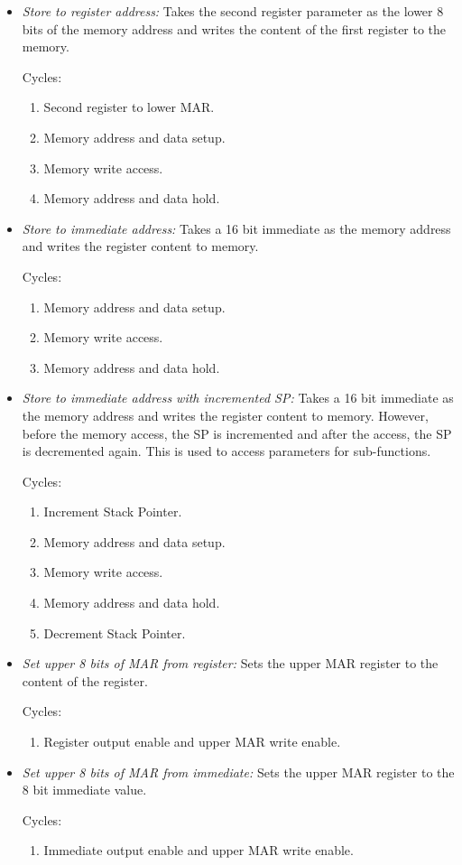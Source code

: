 \begin{itemize}
  \item \emph{Store to register address:} Takes the second register parameter as the lower 8 bits of the memory address and writes the content of the first register to the memory.

  Cycles:
  \begin{enumerate}
    \item Second register to lower \gls{MAR}.
    \item Memory address and data setup.
    \item Memory write access.
    \item Memory address and data hold.
  \end{enumerate}

  \item \emph{Store to immediate address:} Takes a 16 bit immediate as the memory address and writes the register content to memory.

  Cycles:
  \begin{enumerate}
    \item Memory address and data setup.
    \item Memory write access.
    \item Memory address and data hold.
  \end{enumerate}

  \item \emph{Store to immediate address with incremented \gls{SP}:} Takes a 16 bit immediate as the memory address and writes the register content to memory.
  However, before the memory access, the \gls{SP} is incremented and after the access, the \gls{SP} is decremented again.
  This is used to access parameters for sub-functions.

  Cycles:
  \begin{enumerate}
    \item Increment Stack Pointer.
    \item Memory address and data setup.
    \item Memory write access.
    \item Memory address and data hold.
    \item Decrement Stack Pointer.
  \end{enumerate}

  \item \emph{Set upper 8 bits of \gls{MAR} from register:} Sets the upper \gls{MAR} register to the content of the register.

  Cycles:
  \begin{enumerate}
    \item Register output enable and upper \gls{MAR} write enable.
  \end{enumerate}

  \item \emph{Set upper 8 bits of \gls{MAR} from immediate:} Sets the upper \gls{MAR} register to the 8 bit immediate value.

  Cycles:
  \begin{enumerate}
    \item Immediate output enable and upper \gls{MAR} write enable.
  \end{enumerate}
\end{itemize}

